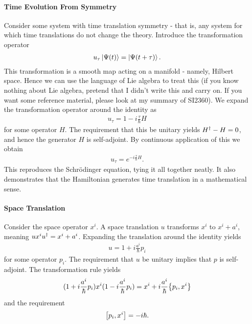 \paragraph{Time Evolution From Symmetry}
Consider some system with time translation symmetry - that is, any system for which time translations do not change the theory. Introduce the transformation operator
\begin{align*}
	u_{\tau}\ket{\Psi(t)} = \ket{\Psi(t + \tau)}.
\end{align*}
This transformation is a smooth map acting on a manifold - namely, Hilbert space. Hence we can use the language of Lie algebra to treat this (if you know nothing about Lie algebra, pretend that I didn't write this and carry on. If you want some reference material, please look at my summary of SI2360). We expand the transformation operator around the identity as
\begin{align*}
	u_{\tau} = 1 - i\frac{\tau}{\hbar}H
\end{align*}
for some operator $H$. The requirement that this be unitary yields $H^{\dagger} - H = 0$, and hence the generator $H$ is self-adjoint. By continuous application of this we obtain
\begin{align*}
	u_{\tau} = e^{-i\frac{\tau}{\hbar}H}.
\end{align*}
This reproduces the Schrödinger equation, tying it all together neatly. It also demonstrates that the Hamiltonian generates time translation in a mathematical sense.

\paragraph{Space Translation}
Consider the space operator $x^{i}$. A space translation $u$ transforms $x^{i}$ to $x^{i} + a^{i}$, meaning $ux^{i}u^{\dagger} = x^{i} + a^{i}$. Expanding the translation around the identity yields
\begin{align*}
	u = 1 + i\frac{a^{i}}{\hbar}p_{i}
\end{align*}
for some operator $p_{i}$. The requirement that $u$ be unitary implies that $p$ is self-adjoint. The transformation rule yields
\begin{align*}
	(1 + i\frac{a^{i}}{\hbar}p_{i})x^{i}(1 - i\frac{a^{i}}{\hbar}p_{i}) = x^{i} + i\frac{a^{i}}{\hbar}\pb{p_{i}}{x^{i}}
\end{align*}
and the requirement
\begin{align*}
	\comm{p_{i}}{x^{i}} = -i\hbar.
\end{align*}

